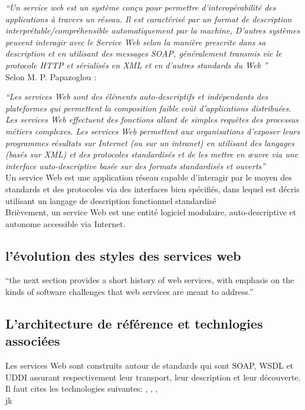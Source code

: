 	\emph{``Un service web est un système conçu pour permettre d'interopérabilité des applications à travers un réseau. 
	    Il est caractérisé par un format de description interprétable/compréhensible automatiquement par la machine,
	    D'autres systèmes peuvent interagir avec le Service Web selon la manière prescrite dans sa description et en
	    utilisant des messages SOAP, généralement transmis vie le protocole HTTP et sérialisés en XML et en d'autres 
	    standards du Web ''}\\

	Selon M. P. Papazoglou \cite{papazoglou2003service}: 

	\emph{``Les services Web sont des éléments auto-descriptifs et indépendants des plateformes qui permettent 
	    la composition faible coût d’applications distribuées.  Les services Web effectuent des fonctions allant 
	    de simples requêtes des processus métiers complexes. Les services Web permettent aux organisations d’exposer 
	    leurs programmes résultats sur Internet (ou sur un intranet) en utilisant des langages (basés sur XML)
	    et des protocoles standardisés et de les mettre en œuvre via une interface auto-descriptive basée sur 
	    des formats standardisés et ouverts''}\\

	Un service Web est une application réseau capable d'interagir par le moyen des standards et des protocoles 
	via des interfaces bien spécifiés, dans lequel est décris utilisant un langage de description fonctionnel
	standardisé \cite{curbera2001web}\\

	Brièvement, un service Web est une entité logiciel modulaire, auto-descriptive et autonome accessible 
	via Internet.

    
    \subsection{l'évolution des styles des services web}
	``the next section provides a short history of web services, with emphasis on the kinds of software challenges
	that web services are meant to address.''

    \subsection{L'architecture de référence et technlogies associées}
	Les services Web sont construits autour de standards qui sont SOAP, WSDL et UDDI assurant respectivement leur
	transport, leur description et leur découverte.\\
	Il faut cites les technologies suivantes: \cite{w3c_ws_arch:2014:Misc}, \cite{soap_1.2_primer:2014:Misc}
	\cite{wsdl1.1:2014:Misc}, \cite{wsdl20:2014:Misc}, \cite{bray1998extensible} \\jk

